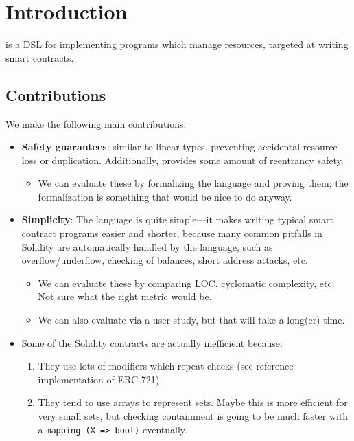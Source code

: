 \documentclass[10pt]{article}
\begin{document}
\section{Introduction}

\langName is a DSL for implementing programs which manage resources, targeted at writing smart contracts.

\subsection{Contributions}

We make the following main contributions:
\begin{itemize}
    \item \textbf{Safety guarantees}: similar to  linear types, preventing accidental resource loss or duplication.
        Additionally, provides some amount of reentrancy safety.

        \begin{itemize}
            \item We can evaluate these by formalizing the language and proving them; the formalization is something that would be nice to do anyway.
        \end{itemize}

    \item \textbf{Simplicity}: The language is quite simple---it makes writing typical smart contract programs easier and shorter, because many common pitfalls in Solidity are automatically handled by the language, such as overflow/underflow, checking of balances, short address attacks, etc.

        \begin{itemize}
            \item We can evaluate these by comparing LOC, cyclomatic complexity, etc.
                Not sure what the right metric would be.

            \item We can also evaluate via a user study, but that will take a long(er) time.
        \end{itemize}

    \item {}
        Some of the Solidity contracts are actually inefficient because:
        \begin{enumerate}
            \item They use lots of modifiers which repeat checks (see reference implementation of ERC-721).
            \item They tend to use arrays to represent sets.
                Maybe this is more efficient for very small sets, but checking containment is going to be much faster with a \lstinline{mapping (X => bool)} eventually.
        \end{enumerate}


\end{itemize}
\end{document}
